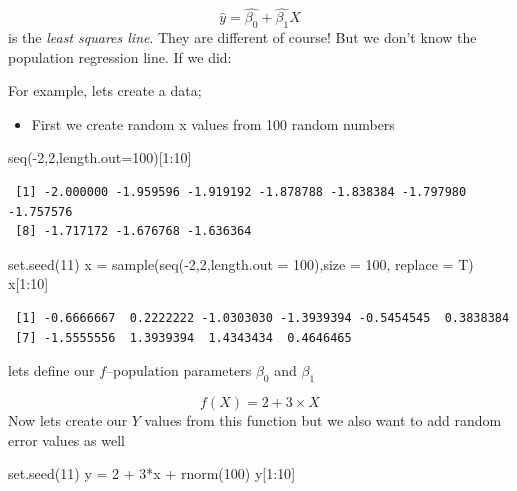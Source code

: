 \documentclass[
  letterpaper,
  DIV=11,
  numbers=noendperiod]{scrreprt}
\newenvironment{Shaded}{\begin{snugshade}}{\end{snugshade}}
\newcommand{\AttributeTok}[1]{\textcolor[rgb]{0.40,0.45,0.13}{#1}}
\newcommand{\DecValTok}[1]{\textcolor[rgb]{0.68,0.00,0.00}{#1}}
\newcommand{\FunctionTok}[1]{\textcolor[rgb]{0.28,0.35,0.67}{#1}}
\newcommand{\NormalTok}[1]{\textcolor[rgb]{0.00,0.23,0.31}{#1}}
\newcommand{\OtherTok}[1]{\textcolor[rgb]{0.00,0.23,0.31}{#1}}
\newcommand{\SpecialCharTok}[1]{\textcolor[rgb]{0.37,0.37,0.37}{#1}}
\providecommand{\tightlist}{%
  \setlength{\itemsep}{0pt}\setlength{\parskip}{0pt}}\usepackage{longtable,booktabs,array}
\begin{document}
\[
\hat{y} = \hat{\beta_0} + \hat{\beta_1}X
\] is the \emph{least squares line}. They are different of course! But
we don't know the population regression line. If we did:

For example, lets create a data;

\begin{itemize}
\tightlist
\item
  First we create random x values from 100 random numbers
\end{itemize}

\begin{Shaded}
\begin{Highlighting}[]
\FunctionTok{seq}\NormalTok{(}\SpecialCharTok{{-}}\DecValTok{2}\NormalTok{,}\DecValTok{2}\NormalTok{,}\AttributeTok{length.out=}\DecValTok{100}\NormalTok{)[}\DecValTok{1}\SpecialCharTok{:}\DecValTok{10}\NormalTok{]}
\end{Highlighting}
\end{Shaded}

\begin{verbatim}
 [1] -2.000000 -1.959596 -1.919192 -1.878788 -1.838384 -1.797980 -1.757576
 [8] -1.717172 -1.676768 -1.636364
\end{verbatim}

\begin{Shaded}
\begin{Highlighting}[]
\FunctionTok{set.seed}\NormalTok{(}\DecValTok{11}\NormalTok{)}
\NormalTok{x }\OtherTok{=} \FunctionTok{sample}\NormalTok{(}\FunctionTok{seq}\NormalTok{(}\SpecialCharTok{{-}}\DecValTok{2}\NormalTok{,}\DecValTok{2}\NormalTok{,}\AttributeTok{length.out =} \DecValTok{100}\NormalTok{),}\AttributeTok{size =} \DecValTok{100}\NormalTok{, }\AttributeTok{replace =}\NormalTok{ T)}
\NormalTok{x[}\DecValTok{1}\SpecialCharTok{:}\DecValTok{10}\NormalTok{]}
\end{Highlighting}
\end{Shaded}

\begin{verbatim}
 [1] -0.6666667  0.2222222 -1.0303030 -1.3939394 -0.5454545  0.3838384
 [7] -1.5555556  1.3939394  1.4343434  0.4646465
\end{verbatim}

lets define our \(f\)--population parameters \(\beta_0\) and \(\beta_1\)

\[
f(X) = 2 + 3\times X
\] Now lets create our \(Y\) values from this function but we also want
to add random error values as well

\begin{Shaded}
\begin{Highlighting}[]
\FunctionTok{set.seed}\NormalTok{(}\DecValTok{11}\NormalTok{)}
\NormalTok{y }\OtherTok{=} \DecValTok{2} \SpecialCharTok{+} \DecValTok{3}\SpecialCharTok{*}\NormalTok{x }\SpecialCharTok{+} \FunctionTok{rnorm}\NormalTok{(}\DecValTok{100}\NormalTok{)}
\NormalTok{y[}\DecValTok{1}\SpecialCharTok{:}\DecValTok{10}\NormalTok{]}
\end{Highlighting}
\end{Shaded}
\end{document}
